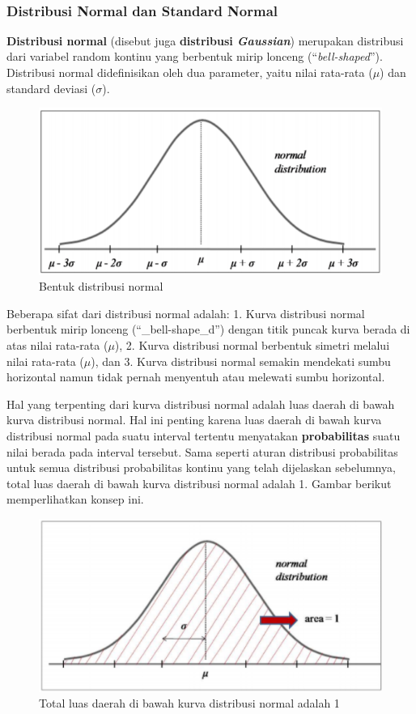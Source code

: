 \documentclass[
]{book}
\begin{document}
~

\hypertarget{distribusi-normal-dan-standard-normal}{%
\subsubsection{Distribusi Normal dan Standard Normal}\label{distribusi-normal-dan-standard-normal}}

\textbf{Distribusi normal} (disebut juga \textbf{distribusi \emph{Gaussian}}) merupakan distribusi dari variabel random kontinu yang berbentuk mirip lonceng (``\emph{bell-shaped}''). Distribusi normal didefinisikan oleh dua parameter, yaitu nilai rata-rata (\(\mu\)) dan standard deviasi (\(\sigma\)).

\begin{figure}

{\centering \includegraphics[width=0.5\linewidth]{images/screening/distribusi_normal} 

}

\caption{Bentuk distribusi normal}\label{fig:unnamed-chunk-3}
\end{figure}

Beberapa sifat dari distribusi normal adalah:
1. Kurva distribusi normal berbentuk mirip lonceng (``\_bell-shape\_d'') dengan titik puncak kurva berada di atas nilai rata-rata (\(\mu\)),
2. Kurva distribusi normal berbentuk simetri melalui nilai rata-rata (\(\mu\)), dan
3. Kurva distribusi normal semakin mendekati sumbu horizontal namun tidak pernah menyentuh atau melewati sumbu horizontal.

Hal yang terpenting dari kurva distribusi normal adalah luas daerah di bawah kurva distribusi normal. Hal ini penting karena luas daerah di bawah kurva distribusi normal pada suatu interval tertentu menyatakan \textbf{probabilitas} suatu nilai berada pada interval tersebut. Sama seperti aturan distribusi probabilitas untuk semua distribusi probabilitas kontinu yang telah dijelaskan sebelumnya, total luas daerah di bawah kurva distribusi normal adalah 1. Gambar berikut memperlihatkan konsep ini.

\begin{figure}

{\centering \includegraphics[width=0.5\linewidth]{images/screening/distribusi_normal_1} 

}

\caption{Total luas daerah di bawah kurva distribusi normal adalah 1}\label{fig:unnamed-chunk-4}
\end{figure}
\end{document}
